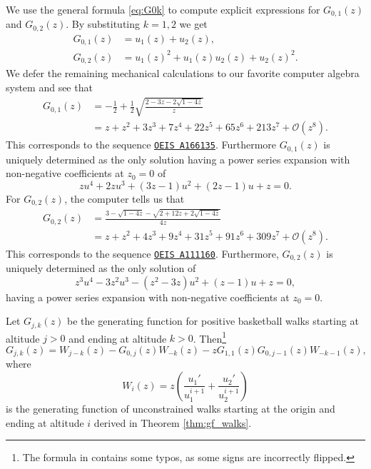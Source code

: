 \begin{example}\label{ex:G01,2}
  We use the general formula \eqref{eq:G0k} to compute explicit expressions for $G_{0,1}(z)$ and $G_{0,2}(z)$. By substituting $k = 1, 2$ we get
  \begin{align*}
    G_{0,1}(z) &= u_{1}(z) + u_{2}(z), \\
    G_{0,2}(z) &= u_{1}(z)^{2}+ u_{1}(z)u_{2}(z) + u_{2}(z)^{2}.
  \end{align*}
  We defer the remaining mechanical calculations to our favorite computer algebra system and see that
  \begin{align*}
    G_{0,1}(z) &= -\frac{1}{2} + \frac{1}{2}\sqrt{\frac{2-3z-2\sqrt{1-4z}}{z}}\\
    &= z + z^{2} + 3z^{3} + 7z^{4} + 22z^{5} + 65z^{6} + 213z^{7} + \mathcal{O}(z^{8}).
  \end{align*}
  This corresponds to the sequence \href{https://oeis.org/A166135}{\texttt{OEIS A166135}}. 
  Furthermore $G_{0,1}(z)$ is uniquely determined as the only solution having a power series expansion with non-negative coefficients at $z_{0} = 0$ of
  $$
    z u^{4}+ 2zu^{3}+ (3z-1)u^{2} + (2z-1)u + z = 0.
  $$
  For $G_{0,2}(z)$, the computer tells us that
  \begin{align*}
    G_{0,2}(z) &= \frac{3 - \sqrt{1-4z} - \sqrt{2+12z+2\sqrt{1-4z}}}{4z} \\
    &= z + z^{2} + 4z^{3} + 9z^{4}+ 31z^{5} + 91z^{6} + 309z^{7} + \mathcal{O}(z^{8}).
  \end{align*}
  This corresponds to the sequence \href{https://oeis.org/A111160}{\texttt{OEIS A111160}}. 
  Furthermore, $G_{0,2}(z)$ is uniquely determined as the only solution of
  $$
    z^3 u^{4} - 3z^{2}u^{3} - (z^{2} - 3z)u^{2} + (z-1)u + z = 0,
  $$
  having a power series expansion with non-negative coefficients at $z_{0} = 0$.
\end{example}

\begin{proposition}
\label{thm:new_proof_basketball}
  Let $G_{j,k}(z)$ be the generating function for positive basketball walks starting at altitude $j > 0$ and ending at altitude $k > 0$. Then\footnote{The formula in \cite[Proposition 6.4]{Basketball} contains some typos, as some signs are incorrectly flipped.}
  \begin{equation} \label{eq:Gjk_alternative}
    G_{j,k}(z) 
    = W_{j - k}(z) - G_{0,j}(z)W_{-k}(z) - z G_{1,1}(z) G_{0,j-1}(z) W_{-k-1}(z),
  \end{equation}
  where
  $$
    W_{i}(z) = z\left(\frac{u_{1}'}{u_{1}^{i+1}}+ \frac{u_{2}'}{u_{2}^{i+1}}\right)
  $$
  is the generating function of unconstrained walks starting at the origin and ending at altitude $i$ derived in Theorem \ref{thm:gf_walks}.
\end{proposition}

